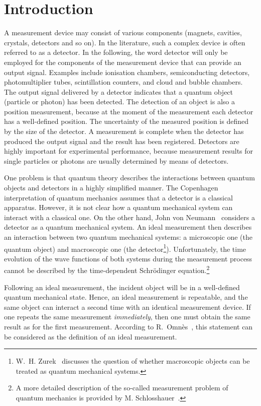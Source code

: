 \documentclass[11pt,a4paper]{article}
\begin{document}
\section{Introduction} 

A measurement device may consist of various components (magnets, cavities, crystals, detectors and so on).  
In the literature, such a complex device is often referred to as a detector.  
In the following, the word detector will only be employed for the components of the measurement device that can provide an output signal.  
Examples include ionisation chambers, semiconducting detectors, photomultiplier tubes, scintillation counters, and cloud and bubble chambers.  
The output signal delivered by a detector indicates that a quantum object (particle or photon) has been detected.  
The detection of an object is also a position measurement, because at the moment of the measurement each detector has a well-defined position.  The uncertainty of the measured position is defined by the size of the detector.  
A measurement is complete when the detector has produced the output signal and the result has been registered.  Detectors are highly important for experimental performance, because measurement results for single particles or photons are usually determined by means of detectors.  

One problem is that quantum theory describes the interactions between quantum objects and detectors in a highly simplified manner.  
The Copenhagen interpretation of quantum mechanics assumes that a detector is a classical apparatus.  However, it is not clear how a quantum mechanical system can interact with a classical one.  
On the other hand, John von Neumann~\cite{Ne32} considers a detector as a quantum mechanical system.  An ideal measurement then describes an interaction between two quantum mechanical systems: a microscopic one (the quantum object) and macroscopic one (the detector\footnote{W.~H. Zurek~\cite{Zu91} discusses the question of whether macroscopic objects can be treated as quantum mechanical systems.}).  
Unfortunately, the time evolution of the wave functions of both systems during the measurement process cannot be described by the time-dependent Schr\"odinger equation.\footnote{A more detailed description of the so-called measurement problem of quantum mechanics is provided by M. Schlosshauer~\cite{Schl}.}   

Following an ideal measurement, the incident object will be in a well-defined quantum mechanical state.  Hence, an ideal measurement is repeatable, and the same object can interact a second time with an identical measurement device.  
If one repeats the same measurement \emph{immediately}, then one must obtain the same result as for the first measurement.  According to R.~Omn\`es~\cite{Om94}, this statement can be considered as the definition of an ideal measurement.  
\end{document}
